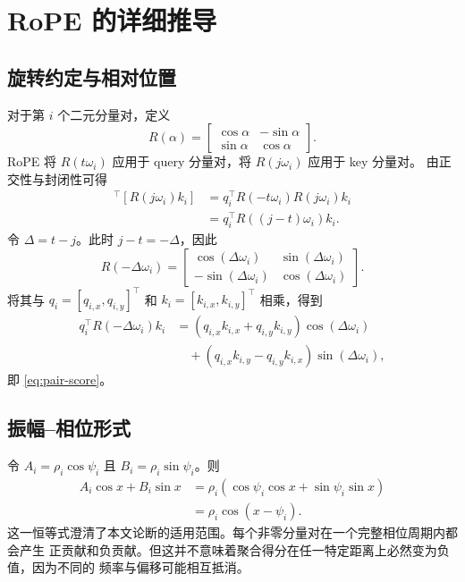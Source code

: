 \section{RoPE 的详细推导}
\label{app:rope-proof}

\subsection{旋转约定与相对位置}

对于第 $i$ 个二元分量对，定义
\begin{equation}
  R(\alpha)=
  \begin{bmatrix}
    \cos\alpha&-\sin\alpha\\
    \sin\alpha&\cos\alpha
  \end{bmatrix}.
\end{equation}
RoPE 将 $R(t\omega_i)$ 应用于 query 分量对，将 $R(j\omega_i)$ 应用于 key 分量对。
由正交性与封闭性可得
\begin{align}
  [R(t\omega_i)q_i]^\top[R(j\omega_i)k_i]
  &=q_i^\top R(-t\omega_i)R(j\omega_i)k_i\\
  &=q_i^\top R((j-t)\omega_i)k_i.
\end{align}
令 $\Delta=t-j$。此时 $j-t=-\Delta$，因此
\begin{equation}
  R(-\Delta\omega_i)=
  \begin{bmatrix}
    \cos(\Delta\omega_i)&\sin(\Delta\omega_i)\\
    -\sin(\Delta\omega_i)&\cos(\Delta\omega_i)
  \end{bmatrix}.
\end{equation}
将其与 $q_i=[q_{i,x},q_{i,y}]^\top$ 和
$k_i=[k_{i,x},k_{i,y}]^\top$ 相乘，得到
\begin{align}
  q_i^\top R(-\Delta\omega_i)k_i
  &=(q_{i,x}k_{i,x}+q_{i,y}k_{i,y})\cos(\Delta\omega_i)\\
  &\quad +(q_{i,x}k_{i,y}-q_{i,y}k_{i,x})\sin(\Delta\omega_i),
\end{align}
即 \cref{eq:pair-score}。

\subsection{振幅--相位形式}

令 $A_i=\rho_i\cos\psi_i$ 且 $B_i=\rho_i\sin\psi_i$。则
\begin{align}
  A_i\cos x+B_i\sin x
  &=\rho_i(\cos\psi_i\cos x+\sin\psi_i\sin x)\\
  &=\rho_i\cos(x-\psi_i).
\end{align}
这一恒等式澄清了本文论断的适用范围。每个非零分量对在一个完整相位周期内都会产生
正贡献和负贡献。但这并不意味着聚合得分在任一特定距离上必然变为负值，因为不同的
频率与偏移可能相互抵消。

